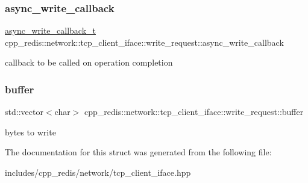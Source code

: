 \subsubsection{\texorpdfstring{async\+\_\+write\+\_\+callback}{async\_write\_callback}}
{\footnotesize\ttfamily \hyperlink{classcpp__redis_1_1network_1_1tcp__client__iface_a1dc52ccc70cf377c4fbb495a16adc658}{async\+\_\+write\+\_\+callback\+\_\+t} cpp\+\_\+redis\+::network\+::tcp\+\_\+client\+\_\+iface\+::write\+\_\+request\+::async\+\_\+write\+\_\+callback}

callback to be called on operation completion \mbox{\label{structcpp__redis_1_1network_1_1tcp__client__iface_1_1write__request_ad3567dac827f550b60491af530f0db2e}} 
\subsubsection{\texorpdfstring{buffer}{buffer}}
{\footnotesize\ttfamily std\+::vector$<$char$>$ cpp\+\_\+redis\+::network\+::tcp\+\_\+client\+\_\+iface\+::write\+\_\+request\+::buffer}

bytes to write 

The documentation for this struct was generated from the following file\+:\begin{DoxyCompactItemize}
\item 
includes/cpp\+\_\+redis/network/tcp\+\_\+client\+\_\+iface.\+hpp\end{DoxyCompactItemize}
